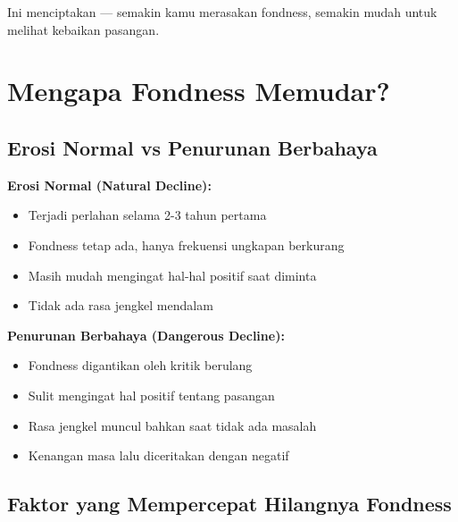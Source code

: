 Ini menciptakan  --- semakin kamu merasakan fondness, semakin mudah untuk melihat kebaikan pasangan.

\section{Mengapa Fondness Memudar?}

\subsection{Erosi Normal vs Penurunan Berbahaya}

\begin{warningbox}
\textbf{Erosi Normal (Natural Decline):}
\begin{itemize}
    \item Terjadi perlahan selama 2-3 tahun pertama
    \item Fondness tetap ada, hanya frekuensi ungkapan berkurang
    \item Masih mudah mengingat hal-hal positif saat diminta
    \item Tidak ada rasa jengkel mendalam
\end{itemize}

\textbf{Penurunan Berbahaya (Dangerous Decline):}
\begin{itemize}
    \item Fondness digantikan oleh kritik berulang
    \item Sulit mengingat hal positif tentang pasangan
    \item Rasa jengkel muncul bahkan saat tidak ada masalah
    \item Kenangan masa lalu diceritakan dengan negatif
\end{itemize}
\end{warningbox}

\subsection{Faktor yang Mempercepat Hilangnya Fondness}

